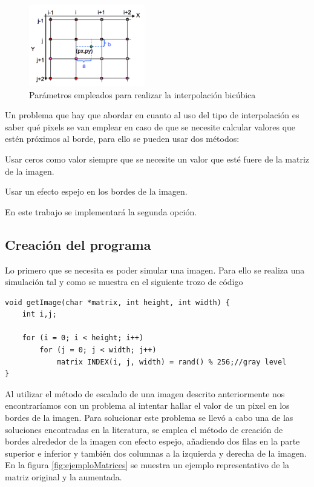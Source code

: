 \documentclass{article}
\begin{document}
\begin{figure}[h]
  \centering
    \includegraphics[width=0.45\textwidth]{img/interpolation.png}
  \caption{Parámetros empleados para realizar la interpolación bicúbica}
  \label{fig:interpolation}
\end{figure}



Un problema que hay que abordar en cuanto al uso del tipo de interpolación es saber qué pixels se van emplear en caso de que se necesite calcular valores que estén próximos al borde, para ello se pueden usar dos métodos:{\setlength{\parskip}{0mm}
\begin{enumerate}{\setlength{\parskip}{0mm}
	\item Usar ceros como valor siempre que se necesite un valor que esté fuere de la matriz de la imagen.
	\item Usar un efecto espejo en los bordes de la imagen.
}\end{enumerate}
}En este trabajo se implementará la segunda opción.

\subsection{Creación del programa}
Lo primero que se necesita es poder simular una imagen. Para ello se realiza una simulación tal y como se muestra en el siguiente trozo de código

\begin{lstlisting}[style=C]
void getImage(char *matrix, int height, int width) {
	int i,j;
	 
	for (i = 0; i < height; i++)
		for (j = 0; j < width; j++)
			matrix INDEX(i, j, width) = rand() % 256;//gray level
}
\end{lstlisting}

Al utilizar el método de escalado de una imagen descrito anteriormente nos encontraríamos con un problema al intentar hallar el valor de un pixel en los bordes de la imagen. Para solucionar este problema se llevó a cabo una de las soluciones encontradas en la literatura, se emplea el método de creación de bordes alrededor de la imagen con efecto espejo, añadiendo dos filas en la parte superior e inferior y también dos columnas a la izquierda y derecha de la imagen. 
En la figura \ref{fig:ejemploMatrices} se muestra un ejemplo representativo de la matriz original y la aumentada.
\end{document}

